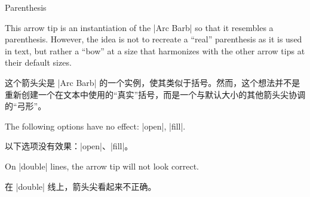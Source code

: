 \begin{arrowtip}{Parenthesis}{
    This arrow tip is an instantiation of the |Arc Barb|  so that it resembles a
    parenthesis. However, the idea is not to recreate a ``real'' parenthesis as
    it is used in text, but rather a ``bow'' at a size that harmonizes with the
    other arrow tips at their default sizes.

    这个箭头尖是 |Arc Barb| 的一个实例，使其类似于括号。然而，这个想法并不是重新创建一个在文本中使用的“真实”括号，而是一个与默认大小的其他箭头尖协调的“弓形”。
}%
{}%
{}

    \begin{arrowexamples}
        \arrowexample[]
        \arrowexampledup[sep]
        \arrowexampledupdot[sep]
        \arrowexample[reversed]
        \arrowexample[round]
        \arrowexample[slant=.3]
        \arrowexample[left]
        \arrowexample[right]
        \arrowexample[red]
    \end{arrowexamples}
    The following options have no effect: |open|, |fill|.

    以下选项没有效果：|open|、|fill|。



    On |double| lines, the arrow tip will not look correct.

    在 |double| 线上，箭头尖看起来不正确。


\end{arrowtip}

